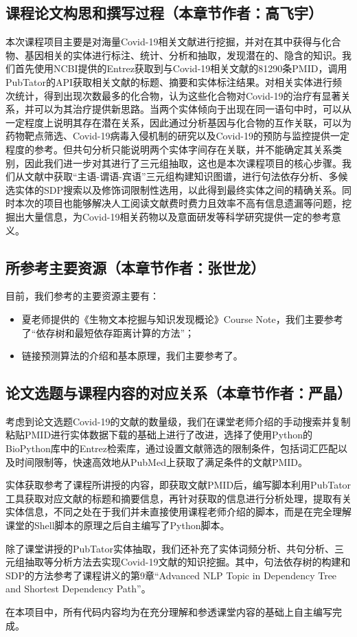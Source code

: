 \documentclass[twocolumn]{article}
\begin{document}
\subsection{课程论文构思和撰写过程（本章节作者：高飞宇）}
本次课程项目主要是对海量Covid-19相关文献进行挖掘，并对在其中获得与化合物、基因相关的实体进行标注、统计、分析和抽取，发现潜在的、隐含的知识。我们首先使用NCBI提供的Entrez获取到与Covid-19相关文献的81290条PMID，调用PubTator的API获取相关文献的标题、摘要和实体标注结果。对相关实体进行频次统计，得到出现次数最多的化合物，认为这些化合物对Covid-19的治疗有显著关系，并可以为其治疗提供新思路。当两个实体倾向于出现在同一语句中时，可以从一定程度上说明其存在潜在关系，因此通过分析基因与化合物的互作关联，可以为药物靶点筛选、Covid-19病毒入侵机制的研究以及Covid-19的预防与监控提供一定程度的参考。但共句分析只能说明两个实体字间存在关联，并不能确定其关系类别，因此我们进一步对其进行了三元组抽取，这也是本次课程项目的核心步骤。我们从文献中获取“主语-谓语-宾语”三元组构建知识图谱，进行句法依存分析、多候选实体的SDP搜索以及修饰词限制性选用，以此得到最终实体之间的精确关系。同时本次的项目也能够解决人工阅读文献费时费力且效率不高有信息遗漏等问题，挖掘出大量信息，为Covid-19相关药物以及意面研发等科学研究提供一定的参考意义。\par

\subsection{所参考主要资源（本章节作者：张世龙）}
目前，我们参考的主要资源主要有：
\begin{itemize}
	\item 夏老师提供的《生物文本挖掘与知识发现概论》Course Note，我们主要参考了“依存树和最短依存距离计算的方法”；
	\item 链接预测算法的介绍和基本原理，我们主要参考了\cite{link_prediction}。
\end{itemize}

\subsection{论文选题与课程内容的对应关系（本章节作者：严晶）}
考虑到论文选题Covid-19的文献的数量级，我们在课堂老师介绍的手动搜索并复制粘贴PMID进行实体数据下载的基础上进行了改进，选择了使用Python的BioPython库中的Entrez检索库，通过设置文献筛选的限制条件，包括词汇匹配以及时间限制等，快速高效地从PubMed上获取了满足条件的文献PMID。\par
实体获取参考了课程所讲授的内容，即获取文献PMID后，编写脚本利用PubTator工具获取对应文献的标题和摘要信息，再针对获取的信息进行分析处理，提取有关实体信息，不同之处在于我们并未直接使用课程老师介绍的脚本，而是在完全理解课堂的Shell脚本的原理之后自主编写了Python脚本。\par
除了课堂讲授的PubTator实体抽取，我们还补充了实体词频分析、共句分析、三元组抽取等分析方法去实现Covid-19文献的知识挖掘。其中，句法依存树的构建和SDP的方法参考了课程讲义的第9章“Advanced NLP Topic in Dependency Tree and Shortest Dependency Path”。\par
在本项目中，所有代码内容均为在充分理解和参透课堂内容的基础上自主编写完成。\par
\end{document}
